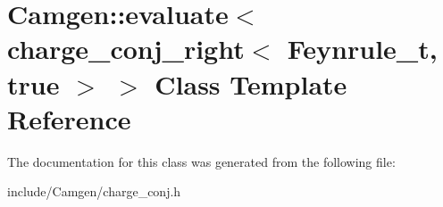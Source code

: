 \hypertarget{a00149}{\section{Camgen\-:\-:evaluate$<$ charge\-\_\-conj\-\_\-right$<$ Feynrule\-\_\-t, true $>$ $>$ Class Template Reference}
\label{a00149}
}


The documentation for this class was generated from the following file\-:\begin{DoxyCompactItemize}
\item 
include/\-Camgen/charge\-\_\-conj.\-h\end{DoxyCompactItemize}
